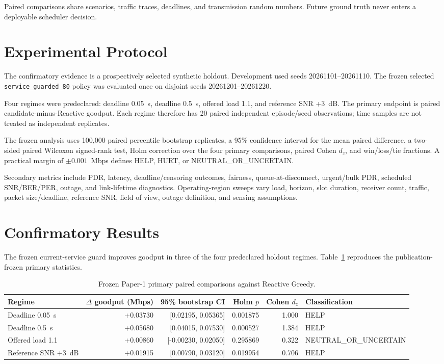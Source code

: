 \documentclass[conference]{IEEEtran}
\begin{document}
Paired comparisons share scenarios, traffic traces, deadlines, and transmission random numbers. Future ground truth never enters a deployable scheduler decision.

\section{Experimental Protocol}
The confirmatory evidence is a prospectively selected synthetic holdout. Development used seeds 20261101--20261110. The frozen selected \texttt{service\_guarded\_80} policy was evaluated once on disjoint seeds 20261201--20261220.

Four regimes were predeclared: deadline 0.05~s, deadline 0.5~s, offered load 1.1, and reference SNR +3~dB. The primary endpoint is paired candidate-minus-Reactive goodput. Each regime therefore has 20 paired independent episode/seed observations; time samples are not treated as independent replicates.

The frozen analysis uses 100,000 paired percentile bootstrap replicates, a 95\% confidence interval for the mean paired difference, a two-sided paired Wilcoxon signed-rank test, Holm correction over the four primary comparisons, paired Cohen $d_z$, and win/loss/tie fractions. A practical margin of $\pm 0.001$~Mbps defines HELP, HURT, or NEUTRAL\_OR\_UNCERTAIN.

Secondary metrics include PDR, latency, deadline/censoring outcomes, fairness, queue-at-disconnect, urgent/bulk PDR, scheduled SNR/BER/PER, outage, and link-lifetime diagnostics. Operating-region sweeps vary load, horizon, slot duration, receiver count, traffic, packet size/deadline, reference SNR, field of view, outage definition, and sensing assumptions.

\section{Confirmatory Results}
The frozen current-service guard improves goodput in three of the four predeclared holdout regimes. Table~\ref{tab:primary} reproduces the publication-frozen primary statistics.

\begin{table}[t]
\centering
\caption{Frozen Paper-1 primary paired comparisons against Reactive Greedy.}
\label{tab:primary}
\begin{tabular}{lrrrrl}
\toprule
Regime & $\Delta$ goodput (Mbps) & 95\% bootstrap CI & Holm $p$ & Cohen $d_z$ & Classification \\
\midrule
Deadline 0.05~s & +0.03730 & [0.02195, 0.05365] & 0.001875 & 1.000 & HELP \\
Deadline 0.5~s & +0.05680 & [0.04015, 0.07530] & 0.000527 & 1.384 & HELP \\
Offered load 1.1 & +0.00860 & [-0.00230, 0.02050] & 0.295869 & 0.322 & NEUTRAL\_OR\_UNCERTAIN \\
Reference SNR +3~dB & +0.01915 & [0.00790, 0.03120] & 0.019954 & 0.706 & HELP \\
\bottomrule
\end{tabular}
\end{table}
\end{document}
